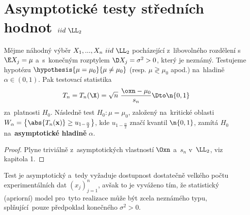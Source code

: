 \section{Asymptotické testy středních hodnot $iid~\LL_2$}
\begin{theorem}[Jednovýběrový asymptotický test $\mu=\mu_0$]
	Mějme náhodný výběr $X_1,...,X_n~iid~\LL_2$ pocházející z~libovolného rozdělení s~$\E X_j=\mu$ a~s~konečným rozptylem $\D X_j=\sigma^2>0$, který je neznámý. Testujeme hypotézu $\hypothesis{\mu=\mu_0}{\mu\neq\mu_0}$ (resp. $\mu\gtrless\mu_0$ apod.) na~hladině $\alpha\in(0,1)$. Pak testovací statistika
	$$ T_n=T_n(\X)=\sqrt{n}~\frac{\oxn-\mu_0}{s_n}\Dto \n{0,1} $$ za~platnosti $H_0$. Následně test $H_0:\mu=\mu_0$, založený na~kritické oblasti $W_\alpha=\left\{ \abs{T_n(\textbf{x})}\geq u_{1-\frac{\alpha}{2}} \right\}$, kde $u_{1-\frac{\alpha}{2}}$ značí kvantil $\n{0,1}$, zamítá $H_0$ na~\textbf{asymptotické hladině} $\alpha$.
	\begin{proof}
		Plyne triviálně z~asymptotických vlastností $\Oxn$ a~$s_n$ v~$\LL_2$, viz kapitola 1.
	\end{proof}
\end{theorem}
\begin{remark}
	Test je asymptotický a~tedy vyžaduje dostupnost dostatečně velkého počtu experimentálních dat $(x_j)_{j=1}^n$, avšak to je vyváženo tím, že statistický (apriorní) model pro~tyto realizace může být zcela neznámého typu, splňující~pouze předpoklad konečného $\sigma^2>0$.
\end{remark}
